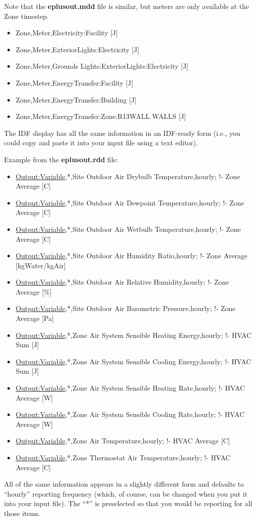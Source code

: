 Note that the \textbf{eplusout.mdd} file is similar, but meters are only available at the Zone timestep.

\begin{itemize}
\item
  Zone,Meter,Electricity:Facility {[}J{]}
\item
  Zone,Meter,ExteriorLights:Electricity {[}J{]}
\item
  Zone,Meter,Grounds Lights:ExteriorLights:Electricity {[}J{]}
\item
  Zone,Meter,EnergyTransfer:Facility {[}J{]}
\item
  Zone,Meter,EnergyTransfer:Building {[}J{]}
\item
  Zone,Meter,EnergyTransfer:Zone:R13WALL WALLS {[}J{]}
\end{itemize}

The IDF display has all the same information in an IDF-ready form (i.e., you could copy and paste it into your input file using a text editor).

Example from the \textbf{eplusout.rdd} file:

\begin{itemize}
\item
  \hyperref[outputvariable]{Output:Variable},*,Site Outdoor Air Drybulb Temperature,hourly; !- Zone Average {[}C{]}
\item
  \hyperref[outputvariable]{Output:Variable},*,Site Outdoor Air Dewpoint Temperature,hourly; !- Zone Average {[}C{]}
\item
  \hyperref[outputvariable]{Output:Variable},*,Site Outdoor Air Wetbulb Temperature,hourly; !- Zone Average {[}C{]}
\item
  \hyperref[outputvariable]{Output:Variable},*,Site Outdoor Air Humidity Ratio,hourly; !- Zone Average {[}kgWater/kgAir{]}
\item
  \hyperref[outputvariable]{Output:Variable},*,Site Outdoor Air Relative Humidity,hourly; !- Zone Average {[}\%{]}
\item
  \hyperref[outputvariable]{Output:Variable},*,Site Outdoor Air Barometric Pressure,hourly; !- Zone Average {[}Pa{]}
\item
  \hyperref[outputvariable]{Output:Variable},*,Zone Air System Sensible Heating Energy,hourly; !- HVAC Sum {[}J{]}
\item
  \hyperref[outputvariable]{Output:Variable},*,Zone Air System Sensible Cooling Energy,hourly; !- HVAC Sum {[}J{]}
\item
  \hyperref[outputvariable]{Output:Variable},*,Zone Air System Sensible Heating Rate,hourly; !- HVAC Average {[}W{]}
\item
  \hyperref[outputvariable]{Output:Variable},*,Zone Air System Sensible Cooling Rate,hourly; !- HVAC Average {[}W{]}
\item
  \hyperref[outputvariable]{Output:Variable},*,Zone Air Temperature,hourly; !- HVAC Average {[}C{]}
\item
  \hyperref[outputvariable]{Output:Variable},*,Zone Thermostat Air Temperature,hourly; !- HVAC Average {[}C{]}
\end{itemize}

All of the same information appears in a slightly different form and defaults to ``hourly'' reporting frequency (which, of course, can be changed when you put it into your input file). The ``*'' is preselected so that you would be reporting for all those items.